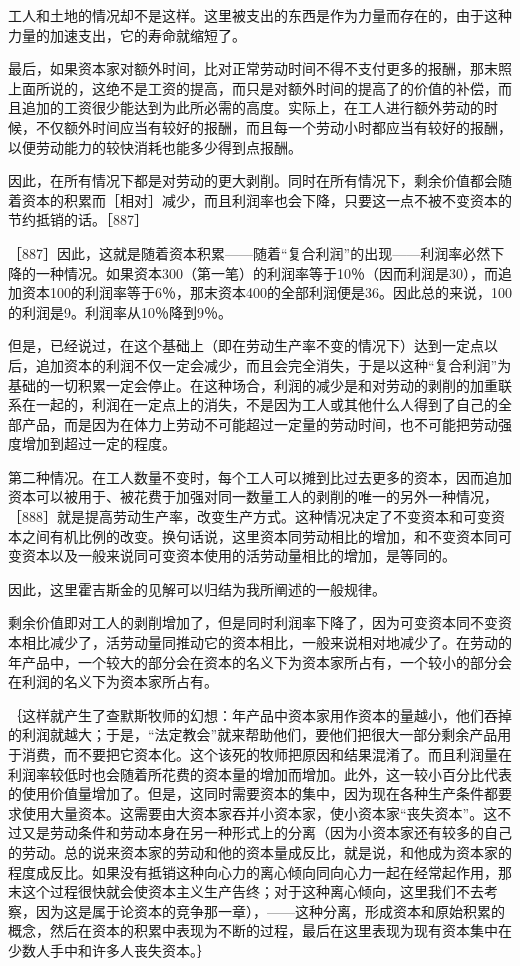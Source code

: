 工人和土地的情况却不是这样。这里被支出的东西是作为力量而存在的，由于这种力量的加速支出，它的寿命就缩短了。

最后，如果资本家对额外时间，比对正常劳动时间不得不支付更多的报酬，那末照上面所说的，这绝不是工资的提高，而只是对额外时间的提高了的价值的补偿，而且追加的工资很少能达到为此所必需的高度。实际上，在工人进行额外劳动的时候，不仅额外时间应当有较好的报酬，而且每一个劳动小时都应当有较好的报酬，以便劳动能力的较快消耗也能多少得到点报酬。

因此，在所有情况下都是对劳动的更大剥削。同时在所有情况下，剩余价值都会随着资本的积累而［相对］减少，而且利润率也会下降，只要这一点不被不变资本的节约抵销的话。［887］

［887］因此，这就是随着资本积累——随着“复合利润”的出现——利润率必然下降的一种情况。如果资本300（第一笔）的利润率等于10％（因而利润是30），而追加资本100的利润率等于6％，那末资本400的全部利润便是36。因此总的来说，100的利润是9。利润率从10％降到9％。

但是，已经说过，在这个基础上（即在劳动生产率不变的情况下）达到一定点以后，追加资本的利润不仅一定会减少，而且会完全消失，于是以这种“复合利润”为基础的一切积累一定会停止。在这种场合，利润的减少是和对劳动的剥削的加重联系在一起的，利润在一定点上的消失，不是因为工人或其他什么人得到了自己的全部产品，而是因为在体力上劳动不可能超过一定量的劳动时间，也不可能把劳动强度增加到超过一定的程度。

第二种情况。在工人数量不变时，每个工人可以摊到比过去更多的资本，因而追加资本可以被用于、被花费于加强对同一数量工人的剥削的唯一的另外一种情况，［888］就是提高劳动生产率，改变生产方式。这种情况决定了不变资本和可变资本之间有机比例的改变。换句话说，这里资本同劳动相比的增加，和不变资本同可变资本以及一般来说同可变资本使用的活劳动量相比的增加，是等同的。

因此，这里霍吉斯金的见解可以归结为我所阐述的一般规律。

剩余价值即对工人的剥削增加了，但是同时利润率下降了，因为可变资本同不变资本相比减少了，活劳动量同推动它的资本相比，一般来说相对地减少了。在劳动的年产品中，一个较大的部分会在资本的名义下为资本家所占有，一个较小的部分会在利润的名义下为资本家所占有。

｛这样就产生了查默斯牧师的幻想：年产品中资本家用作资本的量越小，他们吞掉的利润就越大；于是，“法定教会”就来帮助他们，要他们把很大一部分剩余产品用于消费，而不要把它资本化。这个该死的牧师把原因和结果混淆了。而且利润量在利润率较低时也会随着所花费的资本量的增加而增加。此外，这一较小百分比代表的使用价值量增加了。但是，这同时需要资本的集中，因为现在各种生产条件都要求使用大量资本。这需要由大资本家吞并小资本家，使小资本家“丧失资本”。这不过又是劳动条件和劳动本身在另一种形式上的分离（因为小资本家还有较多的自己的劳动。总的说来资本家的劳动和他的资本量成反比，就是说，和他成为资本家的程度成反比。如果没有抵销这种向心力的离心倾向同向心力一起在经常起作用，那末这个过程很快就会使资本主义生产告终；对于这种离心倾向，这里我们不去考察，因为这是属于论资本的竞争那一章），——这种分离，形成资本和原始积累的概念，然后在资本的积累中表现为不断的过程，最后在这里表现为现有资本集中在少数人手中和许多人丧失资本。｝

